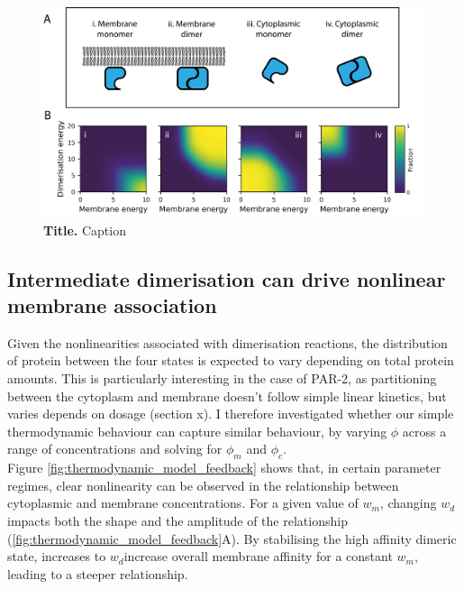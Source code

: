 \documentclass[12pt]{"article"}
\newcommand{\mycaption}[2]{\caption[#1]{\textbf{#1.} #2}}
\begin{document}
\begin{figure}[!h]
\includegraphics[scale=0.9]{thermodynamic_model_species}
\setlength{\abovecaptionskip}{20pt}
\centering
\mycaption{Title}{Caption}
\label{fig:thermodynamic_model_species}
\end{figure}


\subsection{Intermediate dimerisation can drive nonlinear membrane association}

Given the nonlinearities associated with dimerisation reactions, the distribution of protein between the four states is expected to vary depending on total protein amounts. This is particularly interesting in the case of PAR-2, as partitioning between the cytoplasm and membrane doesn’t follow simple linear kinetics, but varies depends on dosage (section x). I therefore investigated whether our simple thermodynamic behaviour can capture similar behaviour, by varying $\phi$ across a range of concentrations and solving for $\phi_m$ and $\phi_c$. \\

Figure \ref{fig:thermodynamic_model_feedback} shows that, in certain parameter regimes, clear nonlinearity can be observed in the relationship between cytoplasmic and membrane concentrations. For a given value of $w_m$, changing $w_d$ impacts both the shape and the amplitude of the relationship (\cref{fig:thermodynamic_model_feedback}A). By stabilising the high affinity dimeric state, increases to $w_d $increase overall membrane affinity for a constant $w_m$, leading to a steeper relationship. \\
\end{document}
